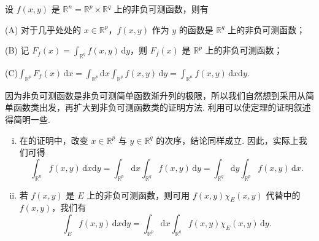 \documentclass[../../main.tex]{subfiles}%
\begin{document}
\begin{theorem}\label{theorem:Tonelli 定理 非负可测函数的情形}
设 \( f(x, y) \) 是 \( \mathbb{R}^n = \mathbb{R}^p \times \mathbb{R}^q \) 上的非负可测函数，则有

(A) 对于几乎处处的 \( x \in \mathbb{R}^p \)，\( f(x, y) \) 作为 \( y \) 的函数是 \( \mathbb{R}^q \) 上的非负可测函数；

(B) 记 \( F_f(x) = \int_{\mathbb{R}^q} f(x, y) \, \mathrm{d}y \)，则 \( F_f(x) \) 是 \( \mathbb{R}^p \) 上的非负可测函数；

(C)$\int_{\mathbb{R}^p} F_f(x) \, \mathrm{d}x = \int_{\mathbb{R}^p} \mathrm{d}x \int_{\mathbb{R}^q} f(x, y) \, \mathrm{d}y = \int_{\mathbb{R}^n} f(x, y) \, \mathrm{d}x\mathrm{d}y.$
\end{theorem}
\begin{note}
因为非负可测函数是非负可测简单函数渐升列的极限，所以我们自然想到采用从简单函数类出发，再扩大到非负可测函数类的证明方法. 利用可以使定理的证明叙述得简明一些. 
\end{note}
\begin{remark}
\begin{enumerate}[(i)]
\item 在的证明中，改变 \( x \in \mathbb{R}^p \) 与 \( y \in \mathbb{R}^q \) 的次序，结论同样成立. 因此，实际上我们可得
\[
\int_{\mathbb{R}^n} f(x, y) \, \mathrm{d}x\mathrm{d}y = \int_{\mathbb{R}^p} \mathrm{d}x \int_{\mathbb{R}^q} f(x, y) \, \mathrm{d}y = \int_{\mathbb{R}^q} \mathrm{d}y \int_{\mathbb{R}^p} f(x, y) \, \mathrm{d}x.
\]

\item 若 \( f(x, y) \) 是 \( E \) 上的非负可测函数，则可用 \( f(x, y) \chi_E(x, y) \) 代替中的 \( f(x, y) \)，我们有
\[
\int_E f(x, y) \, \mathrm{d}x\mathrm{d}y = \int_{\mathbb{R}^p} \mathrm{d}x \int_{\mathbb{R}^q} f(x, y) \chi_E(x, y) \, \mathrm{d}y.
\]
\end{enumerate}
\end{remark}
\end{document}
